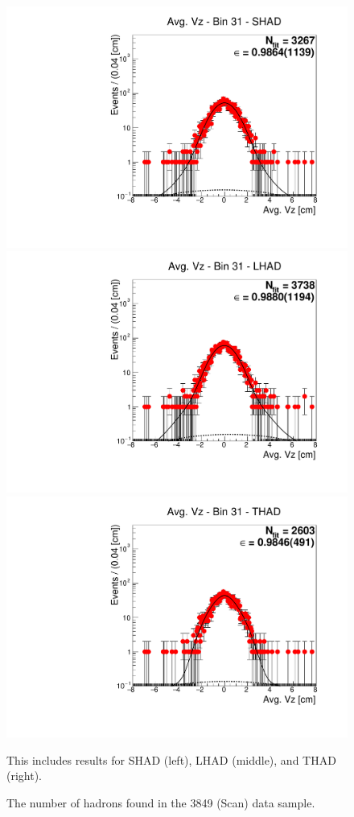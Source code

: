 \begin{figure}[H]
\centering
\includegraphics[scale=0.25]{figures/plots/nonDDbar_fit_results/scan/fit_scan_31_data_SHAD.pdf}
\hspace{-0.5cm}
\includegraphics[scale=0.25]{figures/plots/nonDDbar_fit_results/scan/fit_scan_31_data_LHAD.pdf}
\hspace{-0.5cm}
\includegraphics[scale=0.25]{figures/plots/nonDDbar_fit_results/scan/fit_scan_31_data_THAD.pdf}
\caption{The number of hadrons found in the 3849 (Scan) data sample.}
{This includes results for SHAD (left), LHAD (middle), and THAD (right).}
\label{fig:hadron_fits_scan_31}
\end{figure}

